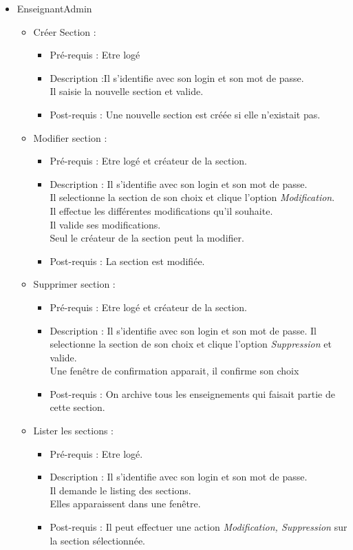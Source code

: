 	\begin{itemize}
	\item EnseignantAdmin
		\begin{itemize}
		\item Cr{\'e}er Section :
			\begin{itemize}
			\item Pr{\'e}-requis : Etre log{\'e} 
			\item Description :Il s'identifie avec son login et son mot de passe. \\
			Il saisie la nouvelle section et valide.
			\item Post-requis : Une nouvelle section est cr{\'e}{\'e}e si elle n'existait pas.
			\end{itemize}

		\item Modifier section :
			\begin{itemize}
			\item Pr{\'e}-requis : Etre log{\'e} et cr{\'e}ateur de la section.
			\item Description : Il s'identifie avec son login et son mot de passe.\\
			Il selectionne la section de son choix et clique l'option {\it Modification}.\\
			Il effectue les diff{\'e}rentes modifications qu'il souhaite.\\
			Il valide ses modifications.\\
			Seul le cr{\'e}ateur de la section peut la modifier.
			\item Post-requis : La section est modifi{\'e}e.
			\end{itemize}

		\item Supprimer section :
			\begin{itemize}
			\item Pr{\'e}-requis : Etre log{\'e} et cr{\'e}ateur de la section.
			\item Description : Il s'identifie avec son login et son mot de passe.
			Il selectionne la section de son choix et clique l'option {\it Suppression} et valide.\\
			Une fen{\^e}tre de confirmation apparait, il confirme son choix
			\item Post-requis : On archive tous les enseignements qui faisait partie de cette section.
			\end{itemize}
		\item Lister les sections :
			\begin{itemize}
			\item Pr{\'e}-requis : Etre log{\'e}.
			\item Description : Il s'identifie avec son login et son mot de passe.\\
			Il demande le listing des sections.\\
			Elles apparaissent dans une fen{\^e}tre.
			\item Post-requis : Il peut effectuer une action {\it Modification, Suppression} sur la section s{\'e}lectionn{\'e}e.\\
			\end{itemize}
		\end{itemize}
	\end{itemize}


